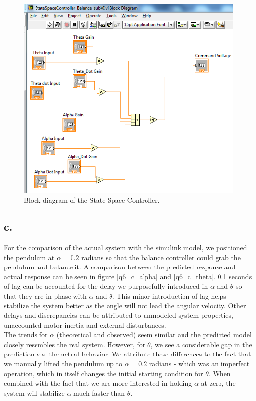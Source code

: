 \documentclass{article}
\theoremstyle{plain}
\theoremstyle{definition}
\theoremstyle{remark}
\begin{document}
\begin{figure}[htb]
\begin{center}
\includegraphics[width = 14cm]{q6_b8.png}
\end{center}
\caption{Block diagram of the State Space Controller.}
\label{q6_b8}
\end{figure}

\clearpage

\subsection*{c.}
For the comparison of the actual system with the simulink model, we positioned the pendulum at $\alpha = 0.2$ radians so that the balance controller could grab the pendulum and balance it. A comparison between the predicted response and actual response can be seen in figure \ref{q6_c_alpha} and \ref{q6_c_theta}. 0.1 seconds of lag can be accounted for the delay we purposefully introduced in $\alpha$ and $\theta$ so that they are in phase with $\dot{\alpha}$ and $\dot{\theta}$. This minor introduction of lag helps stabilize the system better as the angle will not lead the angular velocity. Other delays and discrepancies can be attributed to unmodeled  system properties, unaccounted motor inertia and external disturbances.\\

 The trends for $\alpha$ (theoretical and observed) seem similar and the predicted model closely resembles the real system. However, for $\theta$, we see a considerable gap in the prediction v.s. the actual behavior. We attribute these differences to the fact that we manually lifted the pendulum up to $\alpha = 0.2$ radians - which was an imperfect operation, which in itself changes the initial starting condition for $\theta$. When combined with the fact that we are more interested in holding $\alpha$ at zero, the system will stabilize $\alpha$ much faster than $\theta$.
\end{document}
